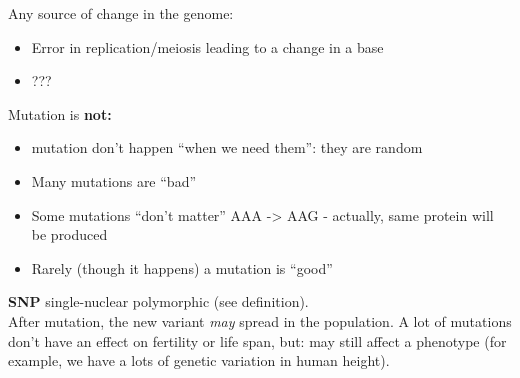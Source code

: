 \documentclass{scrartcl}
\begin{document}
Any source of change in the genome:
\begin{itemize}
\item Error in replication/meiosis leading to a change in a base
\item ???
\end{itemize}

Mutation is {\bf not:}
\begin{itemize}
\item mutation don't happen ``when we need them'': they are random 
\item Many mutations are ``bad''
\item Some mutations ``don't matter'' AAA -> AAG - actually, same protein will be produced
\item Rarely (though it happens) a mutation is ``good''
\end{itemize}

{\bf SNP} single-nuclear polymorphic (see definition).\\
After mutation, the new variant {\em may} spread in the population. 
A lot of mutations don't have an effect on fertility or life span, but: may still affect a phenotype (for example, we have a lots of genetic variation in human height).

\end{document}
